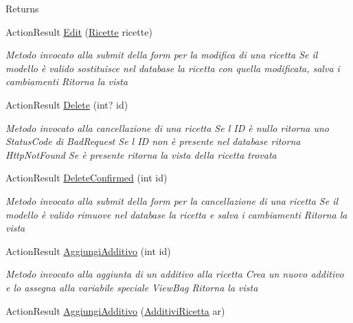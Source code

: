 \begin{DoxyCompactItemize}
\begin{DoxyCompactList}
\begin{DoxyReturn}{Returns}
\end{DoxyReturn}
\end{DoxyCompactList}\item 
Action\+Result \mbox{\hyperlink{class_brew_day2_1_1_controllers_1_1_ricette_controller_a735f22cf3e622b6017c9454115263e3c}{Edit}} (\mbox{\hyperlink{class_brew_day2_1_1_models_1_1_ricette}{Ricette}} ricette)
\begin{DoxyCompactList}\small\item\em Metodo invocato alla submit della form per la modifica di una ricetta Se il modello è valido sostituisce nel database la ricetta con quella modificata, salva i cambiamenti Ritorna la vista \end{DoxyCompactList}\item 
Action\+Result \mbox{\hyperlink{class_brew_day2_1_1_controllers_1_1_ricette_controller_ade6fa19c3ce5fdda6e6c77b1e0412edf}{Delete}} (int? id)
\begin{DoxyCompactList}\small\item\em Metodo invocato alla cancellazione di una ricetta Se l\textquotesingle{} ID è nullo ritorna uno Status\+Code di Bad\+Request Se l\textquotesingle{} ID non è presente nel database ritorna Http\+Not\+Found Se è presente ritorna la vista della ricetta trovata \end{DoxyCompactList}\item 
Action\+Result \mbox{\hyperlink{class_brew_day2_1_1_controllers_1_1_ricette_controller_a22512431b6ea93f05438a784298b6618}{Delete\+Confirmed}} (int id)
\begin{DoxyCompactList}\small\item\em Metodo invocato alla submit della form per la cancellazione di una ricetta Se il modello è valido rimuove nel database la ricetta e salva i cambiamenti Ritorna la vista \end{DoxyCompactList}\item 
Action\+Result \mbox{\hyperlink{class_brew_day2_1_1_controllers_1_1_ricette_controller_a8f87299b4d88f8549bf9f7f1f7b87cac}{Aggiungi\+Additivo}} (int id)
\begin{DoxyCompactList}\small\item\em Metodo invocato alla aggiunta di un additivo alla ricetta Crea un nuovo additivo e lo assegna alla variabile speciale View\+Bag Ritorna la vista \end{DoxyCompactList}\item 
Action\+Result \mbox{\hyperlink{class_brew_day2_1_1_controllers_1_1_ricette_controller_a1b19ee41b194df5a863f885e7f4b2d50}{Aggiungi\+Additivo}} (\mbox{\hyperlink{class_brew_day2_1_1_models_1_1_additivi_ricetta}{Additivi\+Ricetta}} ar)

\end{DoxyCompactItemize}
